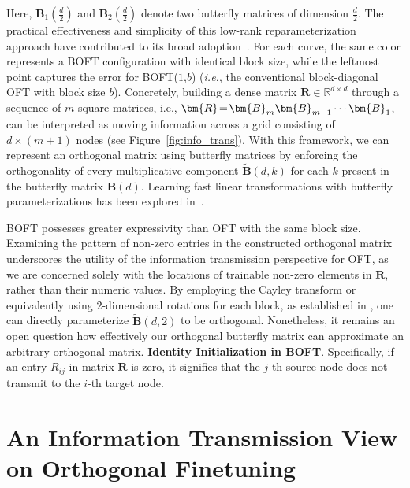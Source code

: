 \begin{itemize}[leftmargin=*,nosep]
Here, $\bm{B}_1(\frac{d}{2})$ and $\bm{B}_2(\frac{d}{2})$ denote two butterfly matrices of dimension $\frac{d}{2}$. The practical effectiveness and simplicity of this low-rank reparameterization approach have contributed to its broad adoption~\cite{dettmers2023qlora,zi2023delta,chavan2023one}. For each curve, the same color represents a BOFT configuration with identical block size, while the leftmost point captures the error for BOFT($1$,$b$) (\emph{i.e.}, the conventional block-diagonal OFT with block size $b$). Concretely, building a dense matrix $\bm{R}\in\mathbb{R}^{d\times d}$ through a sequence of $m$ square matrices, i.e., $\thickmuskip=2mu \medmuskip=2mu \bm{R}=\bm{B}_m\bm{B}_{m-1}\cdots\bm{B}_1$, can be interpreted as moving information across a grid consisting of $d\times(m+1)$ nodes (see Figure~\ref{fig:info_trans}). With this framework, we can represent an orthogonal matrix using butterfly matrices by enforcing the orthogonality of every multiplicative component $\tilde{\bm{B}}(d,k)$ for each $k$ present in the butterfly matrix $\bm{B}(d)$. Learning fast linear transformations with butterfly parameterizations has been explored in~\cite{dao2019learning,dao2019kaleidoscope}. \begin{theorem}\label{thm:exp_boft}
    BOFT possesses greater expressivity than OFT with the same block size. Examining the pattern of non-zero entries in the constructed orthogonal matrix underscores the utility of the information transmission perspective for OFT, as we are concerned solely with the locations of trainable non-zero elements in $\bm{R}$, rather than their numeric values. By employing the Cayley transform or equivalently using $2$-dimensional rotations for each block, as established in \cite{liu2021orthogonal,qiu2023controlling}, one can directly parameterize $\tilde{\bm{B}}(d,2)$ to be orthogonal. Nonetheless, it remains an open question how effectively our orthogonal butterfly matrix can approximate an arbitrary orthogonal matrix. \textbf{Identity Initialization in BOFT}. Specifically, if an entry $R_{ij}$ in matrix $\bm{R}$ is zero, it signifies that the $j$-th source node does not transmit to the $i$-th target node. \section{An Information Transmission View on Orthogonal Finetuning}


\end{theorem}
\end{itemize}
